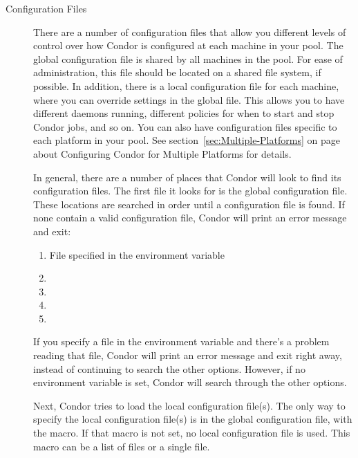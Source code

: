 \begin{description}
\label{sec:Config-File-Locations}
\begin{description}
\item[Configuration Files] There are a number of configuration files
that allow you
different levels of control over how Condor is configured at each
machine in your pool.  
The global configuration file is shared by all machines in the pool.
For ease of administration, this file should be located on a shared
file system, if possible.
In addition, there is a local
configuration file for each machine, where you can override settings in the
global file.  This allows you to have different daemons running,
different policies for when to start and stop Condor jobs, and so on.
You can also have configuration files specific to each platform in your pool.
See
section~\ref{sec:Multiple-Platforms} on
page~\pageref{sec:Multiple-Platforms} about Configuring Condor for
Multiple Platforms for details.

In general, there are a number of places that Condor will look to find
its configuration files.  The first file it looks for is the global configuration
file.  These locations are searched in order until a configuration file is
found.  If none contain a valid configuration file, Condor will print an
error message and exit:
\begin{enumerate}
   \item File specified in the  environment variable
   \item {}
   \item {}
   \item {}
   \item {}
\end{enumerate}

If you specify a file in the  environment variable
and there's a problem reading that file, Condor will print an error
message and exit right away, instead of continuing to search the other
options.
However, if no  environment variable is set,
Condor will search through the other options.

Next, Condor tries to load the local configuration file(s).
The only way to specify the local configuration file(s) is in the global configuration
file, with the  macro.  If that macro is not
set, no local configuration file is used.  This macro can be a list of files
or a single file.


\end{description}
\end{description}
